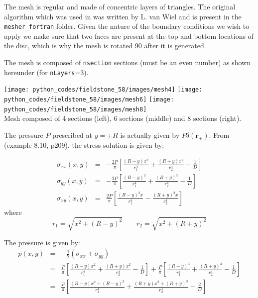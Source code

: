 The mesh is regular and made of concentric layers of triangles. The original algorithm
which was used in \elefant was written by L. van Wiel and is present in the {\tt mesher\_fortran} folder.  
Given the nature of the boundary 
conditions we wish to apply we make sure that two faces are present at the top and bottom 
locations of the disc, which is why the mesh is rotated 90\degree 
after it is generated.  

The mesh is composed of {\tt nsection} sections (must be an even number)
as shown hereunder (for {\tt nLayers}=3). 
\begin{center}
\texttt{[image: python\_codes/fieldstone\_58/images/mesh4]}
\texttt{[image: python\_codes/fieldstone\_58/images/mesh6]}
\texttt{[image: python\_codes/fieldstone\_58/images/mesh8]}\\
{\captionfont Mesh composed of 4 sections (left), 6 sections (middle) and 8 sections (right).}
\end{center}

The pressure $P$ prescribed at $y=\pm R$ is actually given by $P \delta({\bm r_\pm})$. 
From \cite{sadd14} (example 8.10, p209), the stress solution is given by:

\begin{eqnarray}
\sigma_{xx}(x,y)&=& -\frac{2P}{\pi}\left[\frac{(R-y)x^2}{r_1^4} + \frac{(R+y)x^2}{r_2^4} -\frac{1}{D} \right] \\
\sigma_{yy}(x,y)&=& -\frac{2P}{\pi}\left[\frac{(R-y)^3}{r_1^4} + \frac{(R+y)^3}{r_2^4} -\frac{1}{D} \right] \\
\sigma_{xy}(x,y)&=&  \frac{2P}{\pi}\left[\frac{(R-y)^2 x}{r_1^4} - \frac{(R+y)^2x}{r_2^4}  \right]
\end{eqnarray}
where 
\[
r_1=\sqrt{x^2 + (R-y)^2}
\quad\quad
r_2=\sqrt{x^2 + (R+y)^2}
\]

The pressure is given by:
\begin{eqnarray}
p(x,y) 
&=& -\frac{1}{2}(\sigma_{xx} + \sigma_{yy}) \nonumber\\
&=& 
 \frac{P}{\pi} \left[ \frac{(R-y)x^2}{r_1^4} + \frac{(R+y)x^2}{r_2^4} -\frac{1}{D} \right] 
+ \frac{P}{\pi} \left[ \frac{(R-y)^3}{r_1^4} + \frac{(R+y)^3}{r_2^4} -\frac{1}{D} \right] \\
&=& 
\frac{P}{\pi} \left[ \frac{(R-y)x^2 + (R-y)^3 }{r_1^4} + \frac{(R+y)x^2 + (R+y)^3}{r_2^4} - \frac{2}{D}\right] 
\end{eqnarray}

